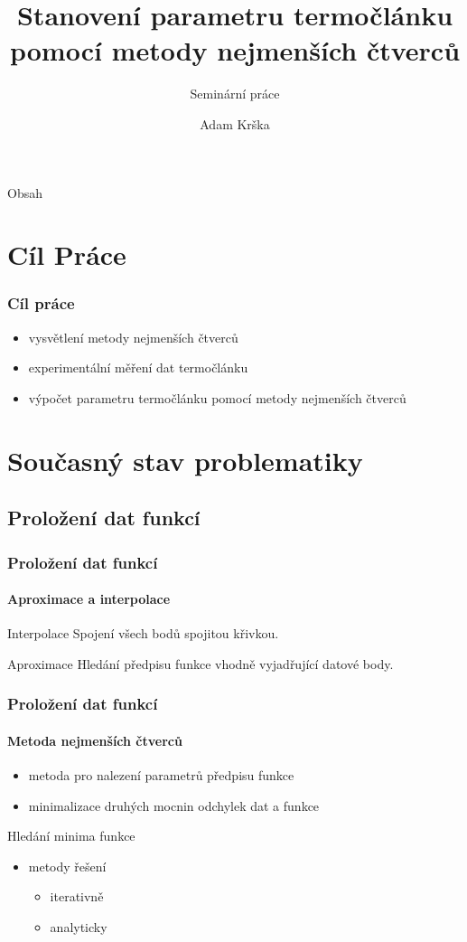 \documentclass[smaller,aspectratio=1610,handout]{beamer}
\author[A. Krška]{Adam Krška}
\title[Stanovení parametru termočlánku]{Stanovení parametru termočlánku pomocí
metody nejmenších čtverců}
\subtitle{Seminární práce}
\institute[GSS Mikulov]{Gymnázium a střední odborná škola Mikulov}
\date{}
\newcommand\sumi{\sum_{i=1}^n}
\begin{document}
\frame[plain]{\titlepage}

\begin{frame}{Obsah}
	\tableofcontents
\end{frame}
\section{Cíl Práce}

\begin{frame}
	\frametitle{Cíl práce}
	\begin{itemize}
		\item vysvětlení metody nejmenších čtverců
		\item experimentální měření dat termočlánku
		\item výpočet parametru termočlánku pomocí metody nejmenších čtverců
	\end{itemize}	
\end{frame}

\section{Současný stav problematiky}
\subsection{Proložení dat funkcí}

\begin{frame}
	\frametitle{Proložení dat funkcí}
	\framesubtitle{Aproximace a interpolace}
	
	\begin{block}{Interpolace}
		Spojení všech bodů spojitou křivkou.	
	\end{block}

	\begin{block}{Aproximace}
		Hledání předpisu funkce vhodně vyjadřující datové body.	
	\end{block}
\end{frame}

\begin{frame}
	\frametitle{Proložení dat funkcí}
	\framesubtitle{Metoda nejmenších čtverců}
	\begin{itemize}
		\item metoda pro nalezení parametrů předpisu funkce
		\item minimalizace druhých mocnin odchylek dat a funkce 
	\end{itemize}
	\begin{block}{Hledání minima funkce}
	\vspace*{-0.2\baselineskip}\setlength\belowdisplayshortskip{0pt}
	\eq{S=\sumi\(y_i-f(x_i)\)^2}
	\end{block}

	\begin{itemize}
		\item metody řešení
			\begin{itemize}
				\item iterativně
				\item analyticky
			\end{itemize}
	\end{itemize}
\end{frame}
\end{document}

